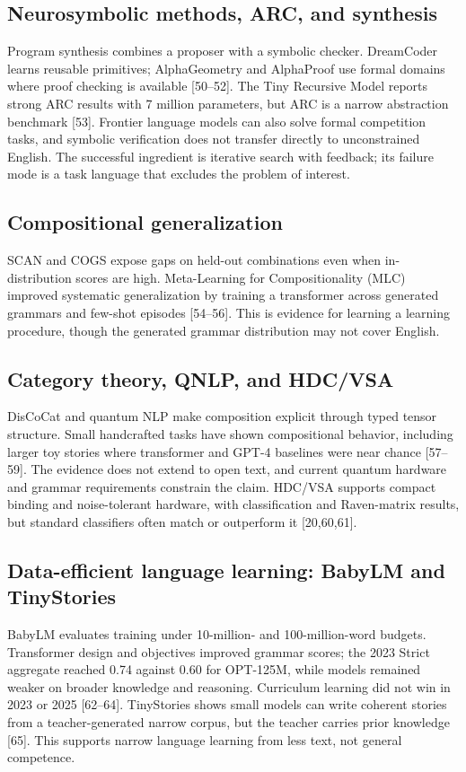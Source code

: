 \subsection{Neurosymbolic methods, ARC, and synthesis}
Program synthesis combines a proposer with a symbolic checker. DreamCoder learns reusable primitives; AlphaGeometry and AlphaProof use formal domains where proof checking is available [50--52]. The Tiny Recursive Model reports strong ARC results with 7 million parameters, but ARC is a narrow abstraction benchmark [53]. Frontier language models can also solve formal competition tasks, and symbolic verification does not transfer directly to unconstrained English. The successful ingredient is iterative search with feedback; its failure mode is a task language that excludes the problem of interest.

\subsection{Compositional generalization}
SCAN and COGS expose gaps on held-out combinations even when in-distribution scores are high. Meta-Learning for Compositionality (MLC) improved systematic generalization by training a transformer across generated grammars and few-shot episodes [54--56]. This is evidence for learning a learning procedure, though the generated grammar distribution may not cover English.

\subsection{Category theory, QNLP, and HDC/VSA}
DisCoCat and quantum NLP make composition explicit through typed tensor structure. Small handcrafted tasks have shown compositional behavior, including larger toy stories where transformer and GPT-4 baselines were near chance [57--59]. The evidence does not extend to open text, and current quantum hardware and grammar requirements constrain the claim. HDC/VSA supports compact binding and noise-tolerant hardware, with classification and Raven-matrix results, but standard classifiers often match or outperform it [20,60,61].

\subsection{Data-efficient language learning: BabyLM and TinyStories}
BabyLM evaluates training under 10-million- and 100-million-word budgets. Transformer design and objectives improved grammar scores; the 2023 Strict aggregate reached 0.74 against 0.60 for OPT-125M, while models remained weaker on broader knowledge and reasoning. Curriculum learning did not win in 2023 or 2025 [62--64]. TinyStories shows small models can write coherent stories from a teacher-generated narrow corpus, but the teacher carries prior knowledge [65]. This supports narrow language learning from less text, not general competence.

